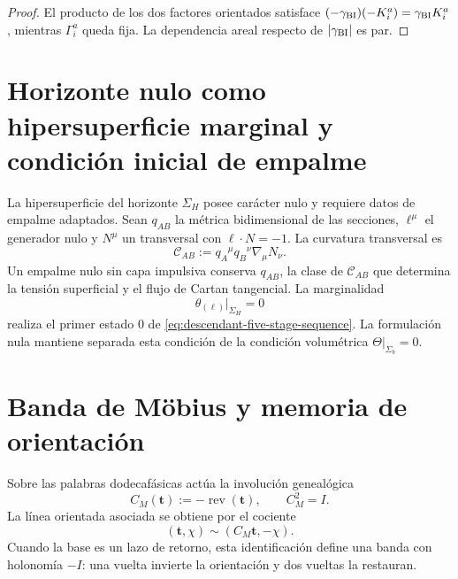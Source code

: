\begin{proof}
El producto de los dos factores orientados satisface
\((-\gamma_{\rm BI})(-K_i^a)=\gamma_{\rm BI}K_i^a\), mientras \(\Gamma_i^a\)
queda fija. La dependencia areal respecto de \(|\gamma_{\rm BI}|\) es par.
\end{proof}

\section{Horizonte nulo como hipersuperficie marginal y condición inicial de empalme}

La hipersuperficie del horizonte \(\Sigma_H\) posee car\'acter nulo y requiere
datos de empalme adaptados. Sean \(q_{AB}\) la m\'etrica bidimensional de las
secciones, \(\ell^\mu\) el generador nulo y \(N^\mu\) un transversal con
\(\ell\cdot N=-1\). La curvatura transversal es
\begin{equation}
 \mathcal C_{AB}
 :=q_A{}^\mu q_B{}^\nu\nabla_\mu N_\nu.
 \label{eq:descendant-null-transverse-curvature}
\end{equation}
Un empalme nulo sin capa impulsiva conserva \(q_{AB}\), la clase de
\(\mathcal C_{AB}\) que determina la tensi\'on superficial y el flujo de
Cartan tangencial. La marginalidad
\begin{equation}
 \theta_{(\ell)}\big|_{\Sigma_H}=0
 \label{eq:descendant-null-marginality}
\end{equation}
realiza el primer estado \(0\) de
\cref{eq:descendant-five-stage-sequence}. La formulaci\'on nula mantiene
separada esta condici\'on de la condici\'on volum\'etrica
\(\Theta|_{\Sigma_b}=0\).

\section{Banda de M\"obius y memoria de orientaci\'on}

Sobre las palabras dodecaf\'asicas act\'ua la involuci\'on geneal\'ogica
\begin{equation}
 C_M(\mathbf t):=-\operatorname{rev}(\mathbf t),
 \qquad
 C_M^2=I.
 \label{eq:descendant-CM}
\end{equation}
La l\'inea orientada asociada se obtiene por el cociente
\begin{equation}
 (\mathbf t,\chi)\sim(C_M\mathbf t,-\chi).
 \label{eq:descendant-Mobius-quotient}
\end{equation}
Cuando la base es un lazo de retorno, esta identificaci\'on define una banda
con holonom\'ia \(-I\): una vuelta invierte la orientaci\'on y dos vueltas la
restauran.

